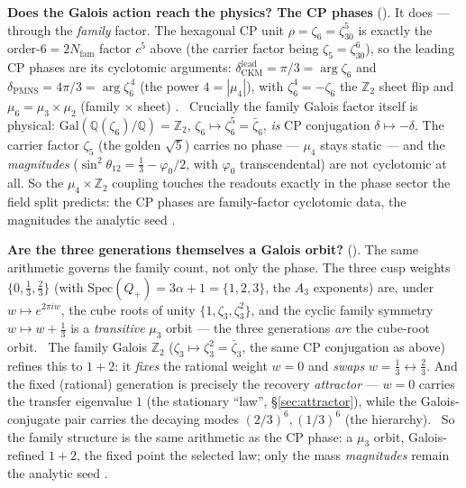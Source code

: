 \documentclass[11pt,a4paper]{article}
\newcommand{\phiz}{\varphi_0}
\newcommand{\Nfam}{N_{\mathrm{fam}}}
\newcommand{\Z}{\mathbb Z}
\begin{document}
\par\smallskip\noindent\textbf{Does the Galois action reach the physics? The CP phases}
(). It does --- through the \emph{family} factor. The hexagonal CP unit
$\rho=\zeta_6=\zeta_{30}^5$ is exactly the order-$6=2\Nfam$ factor $c^5$ above (the carrier factor being
$\zeta_5=\zeta_{30}^6$), so the leading CP phases are its cyclotomic arguments:
$\delta_{\mathrm{CKM}}^{\mathrm{lead}}=\pi/3=\arg\zeta_6$ and $\delta_{\mathrm{PMNS}}=4\pi/3=\arg\zeta_6^{\,4}$ (the
power $4=|\mu_4|$), with $\zeta_6^4=-\zeta_6$ the $\Z_2$ sheet flip and $\mu_6=\mu_3\times\mu_2$ (family $\times$
sheet) \mC. \mE\ Crucially the family Galois factor itself is physical: $\mathrm{Gal}(\mathbb Q(\zeta_6)/\mathbb Q)
=\Z_2$, $\zeta_6\mapsto\zeta_6^5=\bar\zeta_6$, \emph{is} CP conjugation $\delta\mapsto-\delta$. The carrier factor
$\zeta_5$ (the golden $\sqrt5$) carries no phase --- $\mu_4$ stays static --- and the \emph{magnitudes}
($\sin^2\theta_{12}=\tfrac13-\phiz/2$, with $\phiz$ transcendental) are not cyclotomic at all. So the
$\mu_4\times\Z_2$ coupling touches the readouts exactly in the phase sector the field split predicts: the CP phases
are family-factor cyclotomic data, the magnitudes the analytic seed \mE.

\par\smallskip\noindent\textbf{Are the three generations themselves a Galois orbit?}
(). The same arithmetic governs the family count, not only the phase. The three cusp
weights $\{0,\tfrac13,\tfrac23\}$ (with $\mathrm{Spec}(Q_+)=3\alpha+1=\{1,2,3\}$, the $A_3$ exponents) are, under
$w\mapsto e^{2\pi i w}$, the cube roots of unity $\{1,\zeta_3,\zeta_3^2\}$, and the cyclic family symmetry
$w\mapsto w+\tfrac13$ is a \emph{transitive} $\mu_3$ orbit --- the three generations \emph{are} the cube-root orbit.
\mE\ The family Galois $\Z_2$ ($\zeta_3\mapsto\zeta_3^2=\bar\zeta_3$, the same CP conjugation as above) refines this
to $1{+}2$: it \emph{fixes} the rational weight $w=0$ and \emph{swaps} $w=\tfrac13\leftrightarrow\tfrac23$. And the
fixed (rational) generation is precisely the recovery \emph{attractor} --- $w=0$ carries the transfer eigenvalue $1$
(the stationary ``law'', \S\ref{sec:attractor}), while the Galois-conjugate pair carries the decaying modes
$(2/3)^6,(1/3)^6$ (the hierarchy). \mE\ So the family structure is the same arithmetic as the CP phase: a $\mu_3$
orbit, Galois-refined $1{+}2$, the fixed point the selected law; only the mass \emph{magnitudes} remain the analytic
seed \mC.
\end{document}
